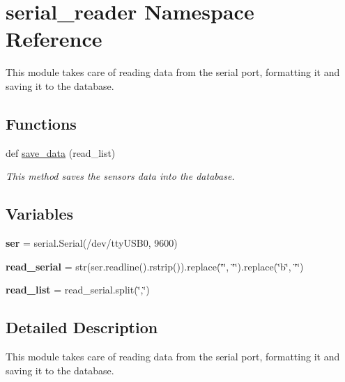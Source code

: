 \hypertarget{namespaceserial__reader}{}\section{serial\+\_\+reader Namespace Reference}
\label{namespaceserial__reader}


This module takes care of reading data from the serial port, formatting it and saving it to the database.  


\subsection*{Functions}
\begin{DoxyCompactItemize}
\item 
def \hyperlink{namespaceserial__reader_a7c6e4b70b62301983b7195509698fdee}{save\+\_\+data} (read\+\_\+list)
\begin{DoxyCompactList}\small\item\em This method saves the sensors data into the database. \end{DoxyCompactList}\end{DoxyCompactItemize}
\subsection*{Variables}
\begin{DoxyCompactItemize}
\item 
\mbox{\label{namespaceserial__reader_a7a0ec18c382bd64638b5b4c9b16faa8a}} 
{\bfseries ser} = serial.\+Serial(\textquotesingle{}/dev/tty\+U\+S\+B0\textquotesingle{}, 9600)
\item 
\mbox{\label{namespaceserial__reader_aa2775e8c4e9269891e0b0e7858c9d215}} 
{\bfseries read\+\_\+serial} = str(ser.\+readline().rstrip()).replace(\char`\"{}\textquotesingle{}\char`\"{}, \char`\"{}\char`\"{}).replace(\char`\"{}b\char`\"{}, \char`\"{}\char`\"{})
\item 
\mbox{\label{namespaceserial__reader_ab0a8815d0881e0d0c7a67658751eb58d}} 
{\bfseries read\+\_\+list} = read\+\_\+serial.\+split(\char`\"{},\char`\"{})
\end{DoxyCompactItemize}


\subsection{Detailed Description}
This module takes care of reading data from the serial port, formatting it and saving it to the database. 

